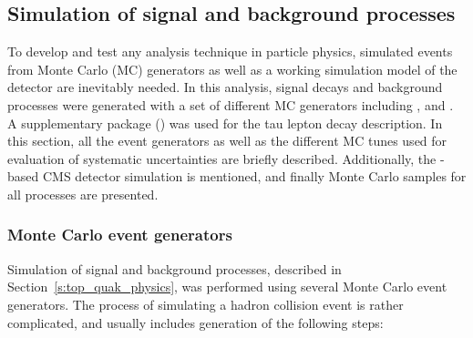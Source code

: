 

\subsection{Simulation of signal and background processes}
\label{ss_top_mass:signal_and_background}

To develop and test any analysis technique in particle physics, simulated events from Monte Carlo (MC) generators as
well as a working simulation model of the detector are inevitably needed. In this analysis, \ttbar signal decays and
background processes were generated with a set of different MC generators including \MADGRAPH \autocite{MadGraph},
\PYTHIA \autocite{Pythia,Pythia6.4} and \POWHEG \autocite{POWHEG}. A supplementary package (\TAUOLA \autocite{TAUOLA})
was used for the tau lepton decay description. In this section, all the event generators as well as the different MC
tunes used for evaluation of systematic uncertainties are briefly described. Additionally, the \GEANTfour-based
\autocite{GEANT4} CMS detector simulation is mentioned, and finally Monte Carlo samples for all processes are
presented.

\subsubsection{Monte Carlo event generators}
\label{sss_top_mass:MC_generators}

Simulation of \ttbar signal and background processes, described in Section~\ref{s:top_quak_physics}, was performed using
several Monte Carlo event generators. The process of simulating a hadron collision event is rather complicated, and
usually includes generation of the following steps:

